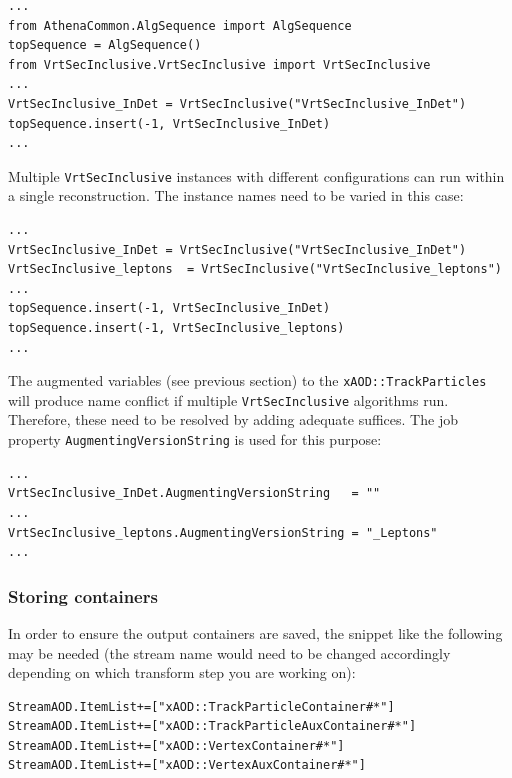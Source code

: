 \begin{scriptsize}
\begin{verbatim}
...
from AthenaCommon.AlgSequence import AlgSequence
topSequence = AlgSequence()
from VrtSecInclusive.VrtSecInclusive import VrtSecInclusive
...
VrtSecInclusive_InDet = VrtSecInclusive("VrtSecInclusive_InDet")
topSequence.insert(-1, VrtSecInclusive_InDet)
...
\end{verbatim}
\end{scriptsize}

Multiple {\tt VrtSecInclusive} instances with different configurations can run within a single reconstruction. The instance names need to be varied in this case:

\begin{scriptsize}
\begin{verbatim}
...
VrtSecInclusive_InDet = VrtSecInclusive("VrtSecInclusive_InDet")
VrtSecInclusive_leptons  = VrtSecInclusive("VrtSecInclusive_leptons")
...
topSequence.insert(-1, VrtSecInclusive_InDet)
topSequence.insert(-1, VrtSecInclusive_leptons)
...
\end{verbatim}
\end{scriptsize}

The augmented variables (see previous section) to the {\tt xAOD::TrackParticles} will produce name conflict if multiple {\tt VrtSecInclusive} algorithms run. Therefore, these need to be resolved by adding adequate suffices. The job property {\tt AugmentingVersionString} is used for this purpose:

\begin{scriptsize}
\begin{verbatim}
...
VrtSecInclusive_InDet.AugmentingVersionString   = ""
...
VrtSecInclusive_leptons.AugmentingVersionString = "_Leptons"
...
\end{verbatim}
\end{scriptsize}

\subsubsection{Storing containers}
In order to ensure the output containers are saved, the snippet like the following may be needed (the stream name would need to be changed accordingly depending on which transform step you are working on):
\begin{scriptsize}
\begin{verbatim}
StreamAOD.ItemList+=["xAOD::TrackParticleContainer#*"]
StreamAOD.ItemList+=["xAOD::TrackParticleAuxContainer#*"]
StreamAOD.ItemList+=["xAOD::VertexContainer#*"]
StreamAOD.ItemList+=["xAOD::VertexAuxContainer#*"]
\end{verbatim}
\end{scriptsize}

